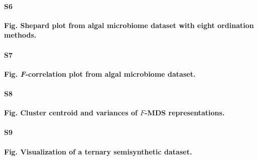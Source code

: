 \documentclass[10pt,letterpaper]{article}
\newcommand{\1}{{\rm 1}\kern-0.24em{\rm I}}
\begin{document}
\paragraph*{S6}\hspace{-2ex}
\label{fig:shepard_alga_all}
\textbf{Fig. Shepard plot from algal microbiome dataset with eight ordination methods.}

\paragraph*{S7}\hspace{-2ex}
\label{fig:f_corr_alga_all}
\textbf{Fig. \textit{F}-correlation plot from algal microbiome dataset.}

\paragraph*{S8}\hspace{-2ex}
\label{fig:fmds_rep_analysis}
\textbf{Fig. Cluster centroid and variances of $F$-MDS representations.} 

\paragraph*{S9}\hspace{-2ex}
\label{fig:sim_ternary_vis}
\textbf{Fig. Visualization of a ternary semisynthetic dataset.}
\end{document}
